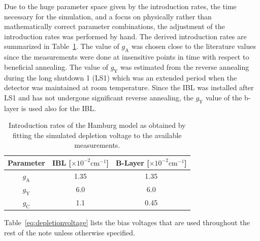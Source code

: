 Due to the huge parameter space given by the introduction rates, the time necessary for the simulation, and a focus on physically rather than mathematically correct parameter combinations, the adjustment of the introduction rates was performed by hand. The derived introduction rates are summarized in Table~\ref{tab:depletionvoltage:introductionrates}.  The value of $g_\text{A}$ was chosen close to the literature values since the measurements were done at insensitive points in time with respect to beneficial annealing. The value of $g_\text{Y}$ was estimated from the reverse annealing during the long shutdown 1 (LS1) which was an extended period when the detector was maintained at room temperature. Since the IBL was installed after LS1 and has not undergone significant reverse annealing, the $g_\text{Y}$ value of the b-layer is used also for the IBL. %

\begin{table}[!htpb]
\centering
\begin{tabular}{ccc}
  \hline
   Parameter & IBL [$\times 10^{-2} \text{cm}^{-1}$] & B-Layer [$\times 10^{-2} \text{cm}^{-1}$]	\\
   \hline
   \hline	
$g_\text{A}$ & 1.35 & 1.35\\
$g_\text{Y}$ & 6.0 & 6.0\\
$g_\text{C}$ & 1.1 & 0.45\\
  \hline  
\end{tabular}
\caption{Introduction rates of the Hamburg model as obtained by fitting the simulated depletion voltage to the available measurements.}
\label{tab:depletionvoltage:introductionrates}
\end{table}



Table~\ref{eq:depletionvoltage} lists the bias voltages that are used throughout the rest of the note unless otherwise specified.

